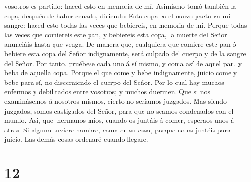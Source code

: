 vosotros es partido: haced esto en memoria de mí.  Asimismo
tomó también la copa, después de haber cenado, diciendo: Esta copa es el
nuevo pacto en mi sangre: haced esto todas las veces que bebiereis, en
memoria de mí.  Porque todas las veces que comiereis este
pan, y bebiereis esta copa, la muerte del Señor anunciáis hasta que
venga.  De manera que, cualquiera que comiere este pan ó
bebiere esta copa del Señor indignamente, será culpado del cuerpo y de
la sangre del Señor.  Por tanto, pruébese cada uno á sí
mismo, y coma así de aquel pan, y beba de aquella copa. 
Porque el que come y bebe indignamente, juicio come y bebe para sí, no
discerniendo el cuerpo del Señor.  Por lo cual hay muchos
enfermos y debilitados entre vosotros; y muchos duermen. 
Que si nos examinásemos á nosotros mismos, cierto no seríamos juzgados.
 Mas siendo juzgados, somos castigados del Señor, para que
no seamos condenados con el mundo.  Así, que, hermanos
míos, cuando os juntáis á comer, esperaos unos á otros.  Si
alguno tuviere hambre, coma en su casa, porque no os juntéis para
juicio. Las demás cosas ordenaré cuando llegare.

\hypertarget{section-11}{%
\section{12}\label{section-11}}

